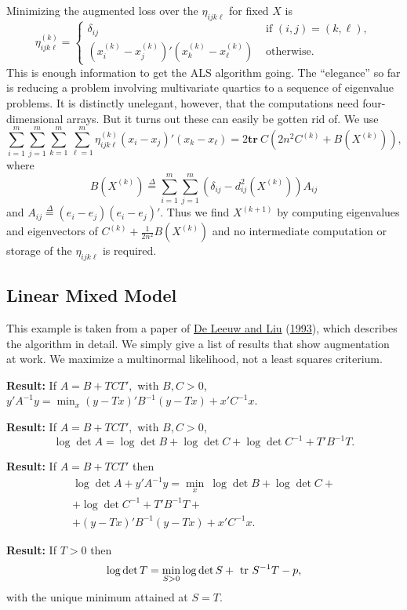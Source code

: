 \documentclass[
  12pt,
]{book}
\begin{document}
Minimizing the augmented loss over
the \(\eta_{ijk\ell}\) for
fixed \(X\) is
\[
\eta_{ijk\ell}^{(k)}=
\begin{cases}
\delta_{ij}&\text{ if } (i,j)=(k,\ell),\\
(x_i^{(k)}-x_j^{(k)})'(x_k^{(k)}-x_\ell^{(k)})&\text{ otherwise}.
\end{cases}
\]
This is enough information to get the ALS algorithm going. The ``elegance'' so far is reducing a problem involving multivariate quartics to a sequence of eigenvalue problems. It is distinctly unelegant, however, that the computations need four-dimensional arrays. But it turns out these can easily be gotten rid of. We use
\[
\sum_{i=1}^m\sum_{j=1}^m\sum_{k=1}^m\sum_{\ell=1}^m\eta_{ijk\ell}^{(k)}(x_i-x_j)'(x_k-x_\ell)=
2\mathbf{tr}\ C\left(2n^2C^{(k)}+
B(X^{(k)})\right),
\]
where
\[
B(X^{(k)})\mathop{=}\limits^{\Delta}\sum_{i=1}^m\sum_{j=1}^m(\delta_{ij}-d_{ij}^2(X^{(k)}))A_{ij}
\]
and \(A_{ij}\mathop{=}\limits^{\Delta}(e_i-e_j)(e_i-e_j)'\).
Thus we find \(X^{(k+1)}\) by computing eigenvalues and eigenvectors of \(C^{(k)}+\frac{1}{2n^2} B(X^{(k)})\) and no intermediate computation or storage of the \(\eta_{ijk\ell}\) is required.

\hypertarget{linear-mixed-model}{%
\subsection{Linear Mixed Model}\label{linear-mixed-model}}

This example is taken from a paper of \protect\hyperlink{ref-deleeuw_liu_R_93}{De Leeuw and Liu} (\protect\hyperlink{ref-deleeuw_liu_R_93}{1993}), which describes the
algorithm in detail. We simply give a list of results that show
augmentation at work. We maximize a multinormal likelihood, not
a least squares criterium.

\textbf{Result:} If \(A=B+TCT',\) with \(B,C>0\),
\(y'A^{-1}y=\min_x (y-Tx)'B^{-1}(y-Tx)+x'C^{-1}x.\)

\textbf{Result:} If \(A=B+TCT',\) with \(B,C>0\),
\[
\log\det{A}=\log\det{B}+\log\det{C}+\log\det{C^{-1}+T'B^{-1}T}.
\]

\textbf{Result:} If \(A=B+TCT'\) then
\begin{multline*}
\log\det{A}+y'A^{-1}y=\min_{x}\
\log\det{B}+\log\det{C}+\\
+\log\det{C^{-1}+T'B^{-1}T}+\\
+(y-Tx)'B^{-1}(y-Tx)+x'C^{-1}x.
\end{multline*}

\textbf{Result:} If \(T>0\) then
\[
\log\det{T}=\min_{S>0}\log\det{S}+\hbox{ tr }S^{-1}T-p,
\]
with the unique minimum attained at \(S=T.\)
\end{document}
